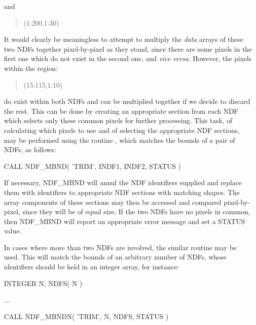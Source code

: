 \documentclass[twoside,11pt,nolof]{starlink}
\providecommand{\st}[1]{{\emph{#1}}}
\begin{document}
and

\small
\begin{quote}
\begin{center}
(1:200,1:30)
\end{center}
\end{quote}
\normalsize

It would clearly be meaningless to attempt to multiply the \st{data\/} arrays
of these two NDFs together pixel-by-pixel as they stand, since there are
some pixels in the first one which do not exist in the second one, and \st{vice versa}.
However, the pixels within the region:

\small
\begin{quote}
\begin{center}
(15:115,1:10)
\end{center}
\end{quote}
\normalsize

do exist within both NDFs and can be multiplied together if we decide to
discard the rest.
This can be done by creating an appropriate section from each NDF which
selects only these common pixels for further processing.
This task, of calculating which pixels to use and of selecting the
appropriate NDF sections, may be performed using the routine ,
which matches the bounds of a pair of NDFs, as follows:

\small
\begin{terminalv}
      CALL NDF_MBND( 'TRIM', INDF1, INDF2, STATUS )
\end{terminalv}
\normalsize

If necessary, NDF\_MBND will annul the NDF identifiers supplied and replace
them with identifiers to appropriate NDF sections with matching shapes.
The array components of these sections may then be accessed and compared
pixel-by-pixel, since they will be of equal size.
If the two NDFs have no pixels in common, then NDF\_MBND will report an
appropriate error message and set a STATUS value.

In cases where more than two NDFs are involved, the similar routine
 may be used.
This will match the bounds of an arbitrary number of NDFs, whose
identifiers should be held in an integer array, for instance:

\small
\begin{terminalv}
      INTEGER N, NDFS( N )

      ...

      CALL NDF_MBNDN( 'TRIM', N, NDFS, STATUS )
\end{terminalv}
\normalsize
\end{document}
